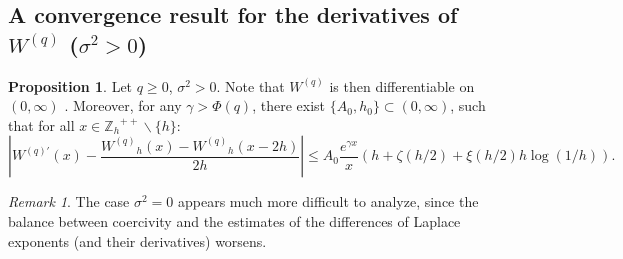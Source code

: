 \documentclass[pdftex,oneside,11pt,reqno]{amsart}
\theoremstyle{definition}
\theoremstyle{theorem}
\newtheorem{proposition}{Proposition}[section]
\theoremstyle{remark}
\newtheorem{remark}{Remark}[section]
\numberwithin{equation}{section}
\numberwithin{definition}{section}
\begin{document}
\subsection{A convergence result for the derivatives of ${W^{(q)}}$ (${\sigma^2}>0$)}\label{subsection:functionals_of_scale_fncs_conv} 

\begin{proposition}
Let $q\geq 0$, ${\sigma^2}>0$. Note that ${W^{(q)}}$ is then differentiable on $(0,\infty)$ \cite[Lemma 2.4]{kuznetsovkyprianourivero}. Moreover, for any $\gamma>\Phi(q)$, there exist $\{A_0,h_0\}\subset (0,\infty)$, such that for all $x\in {\mathbb{Z}_h}^{++}\backslash \{h\}$:
\begin{equation*}
\left\vert{W^{(q)\prime}}(x)-\frac{{W^{(q)}}_h(x)-{W^{(q)}}_h(x-2h)}{2h}\right\vert\leq  A_0\frac{e^{\gamma x}}{x}\left(h+\zeta(h/2)+\xi(h/2)h\log(1/h)\right).
\end{equation*}
\end{proposition}
\begin{remark}
The case ${\sigma^2}=0$ appears much more difficult to analyze, since the balance between coercivity and the estimates of the differences of Laplace exponents (and their derivatives) worsens. 
\end{remark}
\end{document}
